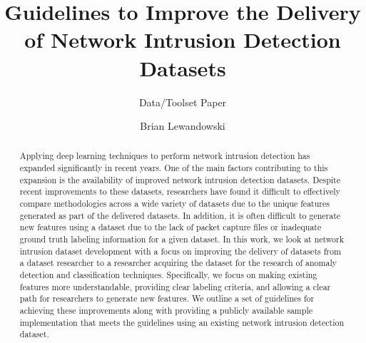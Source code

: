 \documentclass[sigconf, anonymous, screen, review]{acmart}
\begin{document}
\title{Guidelines to Improve the Delivery of Network Intrusion Detection Datasets}
\subtitle{Data/Toolset Paper}

\author{Brian Lewandowski}


\renewcommand{\shortauthors}{Lewandowski et al.}

\begin{abstract}
    Applying deep learning techniques to perform network intrusion detection has expanded significantly in recent years.
    One of the main factors contributing to this expansion is the availability of improved network intrusion detection datasets.
    Despite recent improvements to these datasets, researchers have found it difficult to effectively compare methodologies across a wide variety of datasets due to the unique features generated as part of the delivered datasets.
    In addition, it is often difficult to generate new features using a dataset due to the lack of packet capture files or inadequate ground truth labeling information for a given dataset.
    In this work, we look at network intrusion dataset development with a focus on improving the delivery of datasets from a dataset researcher to a researcher acquiring the dataset for the research of anomaly detection and classification techniques.
    Specifically, we focus on making existing features more understandable, providing clear labeling criteria, and allowing a clear path for researchers to generate new features.
    We outline a set of guidelines for achieving these improvements along with providing a publicly available sample implementation that meets the guidelines using an existing network intrusion detection dataset.
\end{abstract}
\end{document}
